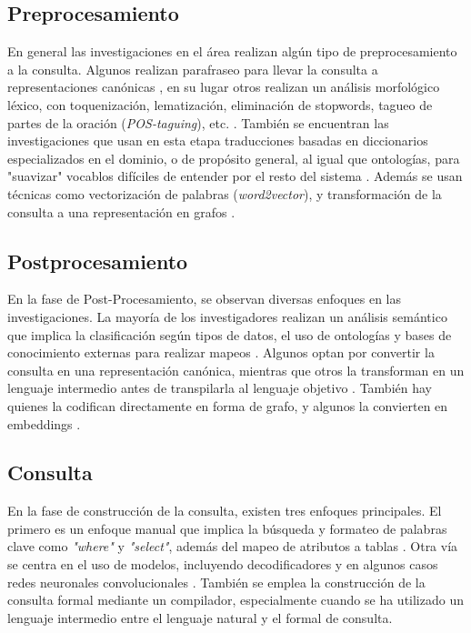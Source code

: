 \subsection{Preprocesamiento} \label{neurosym_approach_preprocessing}

En general las investigaciones en el área realizan algún tipo de preprocesamiento
a la consulta. Algunos realizan parafraseo para llevar la consulta a representaciones
canónicas \cite{canonical}, en su lugar otros realizan un análisis morfológico léxico, con toquenización, lematización, eliminación de stopwords, tagueo de partes de la oración (\textit{POS-taguing}), etc. \cite{postaguing}. También se encuentran las investigaciones que usan en esta etapa traducciones basadas en diccionarios especializados en el dominio, o de propósito general, al igual que ontologías, para "suavizar" vocablos difíciles de entender por el resto del sistema \cite{smoothhardwords}. Además se usan técnicas como vectorización de palabras (\textit{word2vector}), y transformación de la consulta a una representación en grafos \cite{word2vector}.

\subsection{Postprocesamiento} \label{neurosym_approach_postprocessing}

En la fase de Post-Procesamiento, se observan diversas enfoques en las investigaciones. La mayoría de los investigadores realizan un análisis semántico que implica la clasificación según tipos de datos, el uso de ontologías y bases de conocimiento externas para realizar mapeos \cite{postprocessing1} \cite{postprocessing2}. Algunos optan por convertir la consulta en una representación canónica, mientras que otros la transforman en un lenguaje intermedio antes de transpilarla al lenguaje objetivo \cite{postprocessing3}. También hay quienes la codifican directamente en forma de grafo, y algunos la convierten en embeddings \cite{postprocessing4}.

\subsection{Consulta} \label{neurosym_approach_query}

En la fase de construcción de la consulta, existen tres enfoques principales. El primero es un enfoque manual que implica la búsqueda y formateo de palabras clave como \textit{"where"} y \textit{"select"}, además del mapeo de atributos a tablas \cite{neurosymquery1}. Otra vía se centra en el uso de modelos, incluyendo decodificadores y en algunos casos redes neuronales convolucionales \cite{neurosymquery2}. También se emplea la construcción de la consulta formal mediante un compilador, especialmente cuando se ha utilizado un lenguaje intermedio entre el lenguaje natural y el formal de consulta\cite{neurosymquery3}.

